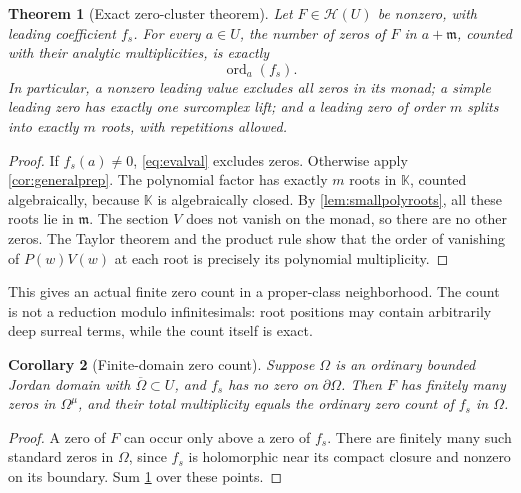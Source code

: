 \documentclass[11pt,oneside]{article}
\numberwithin{equation}{section}
\newtheorem{theorem}{Theorem}[section]
\newtheorem{corollary}[theorem]{Corollary}
\theoremstyle{definition}
\theoremstyle{remark}\newtheorem{remark}[theorem]{Remark}
\newcommand{\K}{\mathbb K}
\newcommand{\HH}{\mathscr H}
\newcommand{\m}{\mathfrak m}
\newcommand{\ord}{\operatorname{ord}}
\begin{document}
\begin{theorem}[Exact zero-cluster theorem]\label{thm:zerocluster}
Let $F\in\HH(U)$ be nonzero, with leading coefficient $f_s$.
For every $a\in U$, the number of zeros of $F$ in $a+\m$, counted
with their analytic multiplicities, is exactly
\[
 \ord_a(f_s).
\]
In particular, a nonzero leading value excludes all zeros in its monad;
a simple leading zero has exactly one surcomplex lift; and a leading
zero of order $m$ splits into exactly $m$ roots, with repetitions allowed.
\end{theorem}
\begin{proof}
If $f_s(a)\ne0$, \eqref{eq:evalval} excludes zeros. Otherwise apply
\cref{cor:generalprep}. The polynomial factor has exactly $m$ roots in
$\K$, counted algebraically, because $\K$ is algebraically closed.
By \cref{lem:smallpolyroots}, all these roots lie in $\m$. The section
$V$ does not vanish on the monad, so there are no other zeros.
The Taylor theorem and the product rule show that the order of vanishing
of $P(w)V(w)$ at each root is precisely its polynomial multiplicity.
\end{proof}
This gives an actual finite zero count in a proper-class neighborhood.
The count is not a reduction modulo infinitesimals: root positions may
contain arbitrarily deep surreal terms, while the count itself is exact.

\begin{corollary}[Finite-domain zero count]\label{cor:domaincount}
Suppose $\Omega$ is an ordinary bounded Jordan domain with
$\overline\Omega\subset U$, and $f_s$ has no zero on $\partial\Omega$.
Then $F$ has finitely many zeros in $\Omega^\mu$, and their total
multiplicity equals the ordinary zero count of $f_s$ in $\Omega$.
\end{corollary}
\begin{proof}
A zero of $F$ can occur only above a zero of $f_s$. There are finitely
many such standard zeros in $\Omega$, since $f_s$ is holomorphic near
its compact closure and nonzero on its boundary. Sum
\cref{thm:zerocluster} over these points.
\end{proof}
\end{document}

